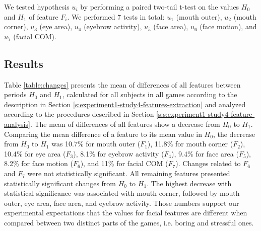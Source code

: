 We tested hypothesis $u_i$ by performing a paired two-tail t-test on the values $H_0$ and $H_1$ of feature $F_i$. We performed 7 tests in total: $u_1$ (mouth outer), $u_2$ (mouth corner), $u_3$ (eye area), $u_4$ (eyebrow activity), $u_5$ (face area), $u_6$ (face motion), and $u_7$ (facial COM).

\subsection{Results}

Table \ref{table:changes} presents the mean of differences of all features between periods $H_0$ and $H_1$, calculated for all subjects in all games according to the description in Section \ref{s:experiment1-study4-features-extraction} and analyzed according to the procedures described in Section \ref{s:s:experiment1-study4-feature-analysis}. The mean of differences of all features show a decrease from $H_0$ to $H_1$. Comparing the mean difference of a feature to its mean value in $H_0$, the decrease from $H_0$ to $H_1$ was 10.7\% for mouth outer ($F_1$), 11.8\% for mouth corner ($F_2$), 10.4\% for eye area ($F_3$), 8.1\% for eyebrow activity ($F_4$), 9.4\% for face area ($F_5$), 8.2\% for face motion ($F_6$), and 11\% for facial COM ($F_7$). Changes related to $F_6$ and $F_7$ were not statistically significant. All remaining features presented statistically significant changes from $H_0$ to $H_1$. The highest decrease with statistical significance was associated with mouth corner, followed by mouth outer, eye area, face area, and eyebrow activity. Those numbers support our experimental expectations that the values for facial features are different when compared between two distinct parts of the games, i.e. boring and stressful ones.


